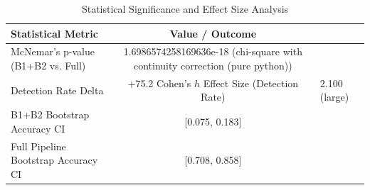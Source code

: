 \begin{table}[h]
\centering
\caption{Statistical Significance and Effect Size Analysis}
\label{tab:semantic_stats}
\begin{tabular}{lc}
\hline
\textbf{Statistical Metric} & \textbf{Value / Outcome} \\ \hline
McNemar's p-value (B1+B2 vs. Full) & 1.6986574258169636e-18 (chi-square with continuity correction (pure python)) \\
Detection Rate Delta & +75.2%
Cohen's $h$ Effect Size (Detection Rate) & 2.100 (large) \\
B1+B2 Bootstrap Accuracy CI & [0.075, 0.183] \\
Full Pipeline Bootstrap Accuracy CI & [0.708, 0.858] \\
\hline
\end{tabular}
\end{table}
